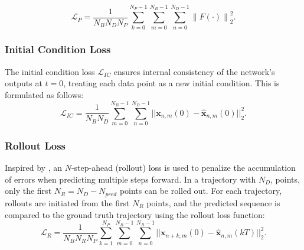 \documentclass[conference]{IEEEtran}
\begin{document}
\begin{equation}
\label{eq:phys_loss}
    \mathcal{L}_P = \frac{1}{N_B N_D N_P} \sum_{k=0}^{N_P - 1} \sum_{m=0}^{N_B - 1} \sum_{n=0}^{N_D - 1} \left\| F\left(\cdot\right) \right\|_2^2.
\end{equation}






\subsubsection{Initial Condition Loss}
The initial condition loss $\mathcal{L}_{IC}$ ensures internal consistency of the network’s outputs at $t=0$, treating each data point as a new initial condition. This is formulated as follows:
\begin{equation}
    \mathcal{L}_{IC} = \frac{1}{N_B N_D} \sum^{N_B-1}_{m=0}\sum^{N_D-1}_{n=0}||\mathbf{x}_{n,m}(0)-\hat{\mathbf{x}}_{n,m}(0)||_2^2.
\end{equation}

\subsubsection{Rollout Loss}
Inspired by \cite{zhao_research_2024}, an $N$-step-ahead (rollout) loss is used to penalize the accumulation of errors when predicting multiple steps forward. In a trajectory with $N_D$, points, only the first $N_R=N_D-N_{pred}$ points can be rolled out. For each trajectory, rollouts are initiated from the first $N_R$ points, and the predicted sequence is compared to the ground truth trajectory using the rollout loss function:
\begin{equation}
    \mathcal{L}_R = \frac{1}{{N_B N_R N_P}} \sum^{N_P}_{k=1} \sum^{N_B-1}_{m=0} \sum^{N_R-1}_{n=0} ||\mathbf{x}_{n+k,m}(0) - \hat{\mathbf{x}}_{n,m}(kT)||_2^2.
\end{equation}

\end{document}
